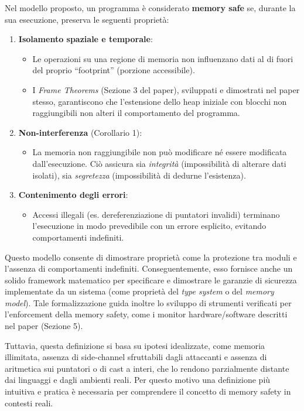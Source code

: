 Nel modello proposto, un programma è considerato \textbf{memory safe} se, durante
la sua esecuzione, preserva le seguenti proprietà:
\begin{enumerate}
  \item \textbf{Isolamento spaziale e temporale}:
    \begin{itemize}
      \item Le operazioni su una regione di memoria non influenzano dati al di fuori
        del proprio ``footprint'' (porzione accessibile).

      \item I \textit{Frame Theorems} (Sezione 3 del paper), sviluppati e dimostrati
        nel paper stesso, garantiscono che l'estensione dello heap iniziale con
        blocchi non raggiungibili non alteri il comportamento del programma.
    \end{itemize}

  \item \textbf{Non-interferenza} (Corollario 1):
    \begin{itemize}
      \item La memoria non raggiungibile non può modificare né essere modificata
        dall'esecuzione. Ciò assicura sia \textit{integrità} (impossibilità di
        alterare dati isolati), sia \textit{segretezza} (impossibilità di
        dedurne l'esistenza).
    \end{itemize}

  \item \textbf{Contenimento degli errori}:
    \begin{itemize}
      \item Accessi illegali (es. dereferenziazione di puntatori invalidi)
        terminano l'esecuzione in modo prevedibile con un errore esplicito, evitando
        comportamenti indefiniti.
    \end{itemize}
\end{enumerate}

Questo modello consente di dimostrare proprietà come la protezione tra moduli e
l'assenza di comportamenti indefiniti. Conseguentemente, esso fornisce anche un
solido framework matematico per specificare e dimostrare le garanzie di
sicurezza implementate da un sistema (come proprietà del \textit{type system} o
del \textit{memory model}). Tale formalizzazione guida inoltre lo sviluppo di strumenti
verificati per l'enforcement della memory safety, come i monitor hardware/software
descritti nel paper (Sezione 5).

Tuttavia, questa definizione si basa su ipotesi idealizzate, come memoria
illimitata, assenza di side-channel sfruttabili dagli attaccanti e assenza di aritmetica
sui puntatori o di cast a interi, che lo rendono parzialmente distante dai
linguaggi e dagli ambienti reali. Per questo motivo una definizione più intuitiva
e pratica è necessaria per comprendere il concetto di memory safety in contesti reali.

